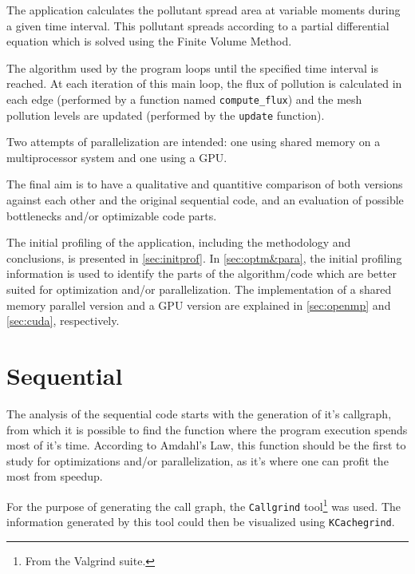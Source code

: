 \documentclass[9pt,twocolumn]{scrartcl}
\begin{document}
The application calculates the pollutant spread area at variable moments during a given time interval. This pollutant spreads according to a partial differential equation which is solved using the Finite Volume Method.

The algorithm used by the program loops until the specified time interval is reached. At each iteration of this main loop, the flux of pollution is calculated in each edge (performed by a function named \texttt{compute\_flux}) and the mesh pollution levels are updated (performed by the \texttt{update} function).

Two attempts of parallelization are intended: one using shared memory on a multiprocessor system and one using a GPU.

The final aim is to have a qualitative and quantitive comparison of both versions against each other and the original sequential code, and an evaluation of possible bottlenecks and/or optimizable code parts.

The initial profiling of the application, including the methodology and conclusions, is presented in \autoref{sec:initprof}. In \autoref{sec:optm&para}, the initial profiling information is used to identify the parts of the algorithm/code which are better suited for optimization and/or parallelization. The implementation of a shared memory parallel version and a GPU version are explained in \autoref{sec:openmp}  and \autoref{sec:cuda}, respectively.

\section{Sequential}%
\label{sec:initprof}
The analysis of the sequential code starts with the generation of it's callgraph, from which it is possible to find the function where the program execution spends most of it's time. According to Amdahl's Law, this function should be the first to study for optimizations and/or parallelization, as it's where one can profit the most from speedup.

For the purpose of generating the call graph, the \texttt{Callgrind} tool\footnote{From the Valgrind suite.} was used. The information generated by this tool could then be visualized using \texttt{KCachegrind}.
\end{document}
